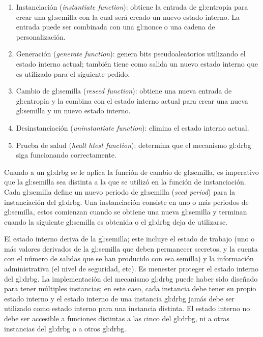 \begin{enumerate}
  \item Instanciación (\textit{instantiate function}): obtiene la entrada de
    \gls{gl:entropia} para crear una \gls{gl:semilla} con la cual será
    creado un nuevo estado interno. La entrada puede ser combinada con
    una \gls{gl:nonce} o una cadena de personalización.
  \item Generación (\textit{generate function}): genera bits pseudoaleatorios
    utilizando el estado interno actual; también tiene como salida un nuevo
    estado interno que es utilizado para el siguiente pedido.
  \item Cambio de \gls{gl:semilla} (\textit{reseed function}): obtiene una
    nueva entrada de \gls{gl:entropia} y la combina con el estado interno
    actual para crear una nueva \gls{gl:semilla} y un nuevo estado interno.
  \item Desinstanciación (\textit{uninstantiate function}): elimina el estado
    interno actual.
  \item Prueba de salud (\textit{healt htest function}): determina que el
    mecanismo \gls{gl:drbg} siga funcionando correctamente.
\end{enumerate}

Cuando a un \gls{gl:drbg} se le aplica la función de cambio de \gls{gl:semilla},
es imperativo que la \gls{gl:semilla} sea distinta a la que se utilizó en la
función de instanciación. Cada \gls{gl:semilla} define un nuevo
periodo de \gls{gl:semilla} (\textit{seed period}) para la instanciación del
\gls{gl:drbg}. Una instanciación consiste en uno o más periodos de
\gls{gl:semilla}, estos comienzan cuando se obtiene una nueva \gls{gl:semilla} y
terminan cuando la siguiente \gls{gl:semilla} es obtenida o el \gls{gl:drbg}
deja de utilizarse.

El estado interno deriva de la \gls{gl:semilla}; este incluye el estado de
trabajo (uno o más valores derivados de la \gls{gl:semilla} que deben
permanecer secretos, y la cuenta con el número de salidas que se han producido
con esa semilla) y la información administrativa (el nivel de seguridad, etc).
Es menester proteger el estado interno del \gls{gl:drbg}. La implementación del
mecanismo \gls{gl:drbg} puede haber sido diseñado para tener múltiples
instancias; en este caso, cada instancia debe tener su propio estado interno y
el estado interno de una instancia \gls{gl:drbg} jamás debe ser utilizado como
estado interno para una instancia distinta. El estado interno no debe ser
accesible a funciones distintas a las cinco del \gls{gl:drbg}, ni a otras
instancias del \gls{gl:drbg} o a otros \gls{gl:drbg}.

